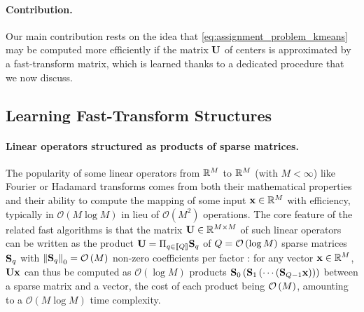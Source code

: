 
\paragraph{Contribution.} Our main contribution rests on the idea that \eqref{eq:assignment_problem_kmeans} may be computed more efficiently if the matrix ${\mathbf{U}}$ of centers is approximated by a fast-transform matrix, which is
learned thanks to a dedicated procedure that we now discuss.



\subsection{Learning Fast-Transform Structures}
\label{sec:palm4msa}

\paragraph{Linear operators structured as products of sparse matrices.}
The popularity of some linear operators from $\mathbb{R}^{M}$ to $\mathbb{R}^{M}$ (with $M<\infty$)
 like Fourier or Hadamard transforms comes from both their mathematical 
 properties and their ability to compute the mapping of some input ${\mathbf{x}}\in\mathbb{R}^M$ with efficiency, typically in $\mathcal{O}\left (M\log M\right )$ in lieu of  
  $\mathcal{O}\left (M^2\right)$ operations.
The core feature of the related fast algorithms is that the matrix ${\mathbf{U}}\in{\mathbb{R}}^{M\times M}$ of such 
linear operators can be written as the product ${\mathbf{U}}=\Pi_{q\in\left \llbracket Q\right \rrbracket}{\mathbf{S}}_q$ 
of $Q=\mathcal{O}\left(\log M\right)$ sparse 
matrices ${\mathbf{S}}_q$ with $\left \|{\mathbf{S}}_q\right \|_0=\mathcal{O}\left( M \right)$ non-zero 
coefficients per factor \cite{LeMagoarou2016Flexible,Morgenstern1975Linear}:
for any vector ${\mathbf{x}}\in{\mathbb{R}}^M$, ${\mathbf{U}}{\mathbf{x}}$ can thus be computed as $\mathcal{O}\left (\log M\right )$ products ${\mathbf{S}}_0 \left ({\mathbf{S}}_1 \left (\cdots \left ({\mathbf{S}}_{Q-1}{\mathbf{x}}\right )\right )\right )$ between a sparse matrix and a vector, the cost of each product being $\mathcal{O}\left(M\right)$, amounting to a $\mathcal{O}(M \log M)$ time complexity.

